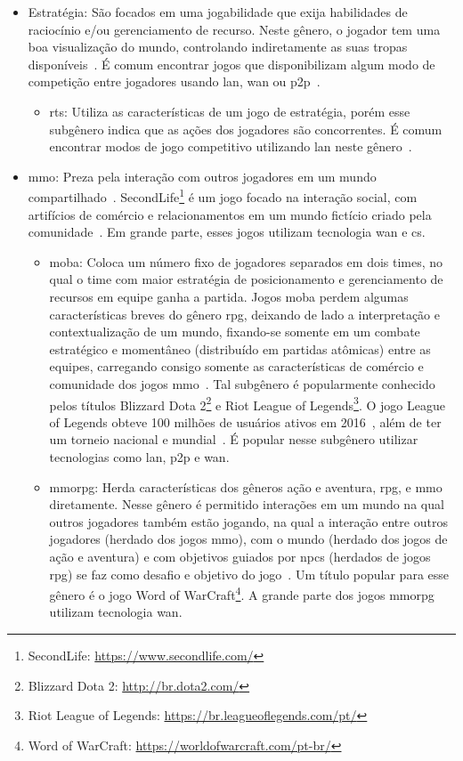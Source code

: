 \begin{itemize}
  \item Estratégia: São focados em uma jogabilidade que exija habilidades de raciocínio e/ou gerenciamento de recurso. Neste gênero, o jogador tem uma boa visualização do mundo, controlando indiretamente as suas tropas disponíveis~\cite{rollings2003andrew}. É comum encontrar jogos que disponibilizam algum modo de competição entre jogadores usando \ac{lan}, \ac{wan} ou \ac{p2p}~\cite{adams_1208533}.
    \begin{itemize}
      \item \ac{rts}: Utiliza as características de um jogo de estratégia, porém esse subgênero indica que as ações dos jogadores são concorrentes. É comum encontrar modos de jogo competitivo utilizando \ac{lan} neste gênero~\cite{adams_1208533}.
    \end{itemize}
  \item \ac{mmo}: Preza pela interação com outros jogadores em um mundo compartilhado~\cite{adams_1208533}. SecondLife\footnote{SecondLife: \url{https://www.secondlife.com/}} é um jogo focado na interação social, com artifícios de comércio e relacionamentos em um mundo fictício criado pela comunidade~\cite{tecmundo_secondlife}. Em grande parte, esses jogos utilizam tecnologia \ac{wan} e \ac{cs}.
    \begin{itemize}
      \item \ac{moba}: Coloca um número fixo de jogadores separados em dois times, no qual o time com maior estratégia de posicionamento e gerenciamento de recursos em equipe ganha a partida. Jogos \ac{moba} perdem algumas características breves do gênero \ac{rpg}, deixando de lado a interpretação e contextualização de um mundo, fixando-se somente em um combate estratégico e momentâneo (distribuído em partidas atômicas) entre as equipes, carregando consigo somente as características de comércio e comunidade dos jogos \ac{mmo}~\cite{adams_1208533}. Tal subgênero é popularmente conhecido pelos títulos Blizzard Dota 2\footnote{Blizzard Dota 2: \url{http://br.dota2.com/}} e Riot League of Legends\footnote{Riot League of Legends: \url{https://br.leagueoflegends.com/pt/}}. O jogo League of Legends obteve 100 milhões de usuários ativos em 2016~\cite{lol_statista}, além de ter um torneio nacional e mundial~\cite{lol_sportv}. É popular nesse subgênero utilizar tecnologias como \ac{lan}, \ac{p2p} e \ac{wan}.
      \item \ac{mmorpg}: Herda características dos gêneros ação e aventura, \ac{rpg}, e \ac{mmo} diretamente. Nesse gênero é permitido interações em um mundo na qual outros jogadores também estão jogando, na qual a interação entre outros jogadores (herdado dos jogos \ac{mmo}), com o mundo (herdado dos jogos de ação e aventura) e com objetivos guiados por \acp{npc} (herdados de jogos \ac{rpg}) se faz como desafio e objetivo do jogo~\cite{adams_1208533}. Um título popular para esse gênero é o jogo Word of WarCraft\footnote{Word of WarCraft: \url{https://worldofwarcraft.com/pt-br/}}. A grande parte dos jogos \ac{mmorpg} utilizam tecnologia \ac{wan}.

\end{itemize}
\end{itemize}
